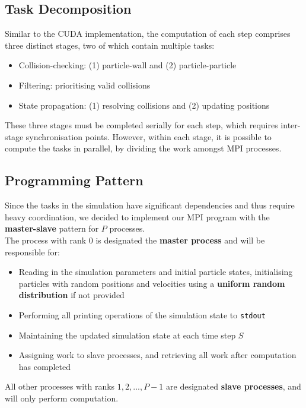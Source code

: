 \documentclass[12pt]{article}
\begin{document}
\subsection{Task Decomposition}
\label{subsection:task-decomposition}
Similar to the CUDA implementation, the computation of each step comprises three distinct stages, two of which contain multiple tasks:
\begin{itemize}
    \item Collision-checking: (1) particle-wall and (2) particle-particle
    \item Filtering: prioritising valid collisions
    \item State propagation: (1) resolving collisions and (2) updating positions
\end{itemize}

These three stages must be completed serially for each step, which requires inter-stage synchronisation points. However, within each stage, it is possible to compute the tasks in parallel, by dividing the work amongst MPI processes.

\subsection{Programming Pattern}
Since the tasks in the simulation have significant dependencies and thus require heavy coordination, we decided to implement our MPI program with the \textbf{master-slave} pattern for $P$ processes.\\

The process with rank $0$ is designated the \textbf{master process} and will be responsible for:
\begin{itemize}
    \item Reading in the simulation parameters and initial particle states, initialising particles with random positions and velocities using a \textbf{uniform random distribution} if not provided
    \item Performing all printing operations of the simulation state to \texttt{stdout}
    \item Maintaining the updated simulation state at each time step $S$
    \item Assigning work to slave processes, and retrieving all work after computation has completed
\end{itemize}

All other processes with ranks $1, 2, ..., P - 1$ are designated \textbf{slave processes}, and will only perform computation.
\end{document}
